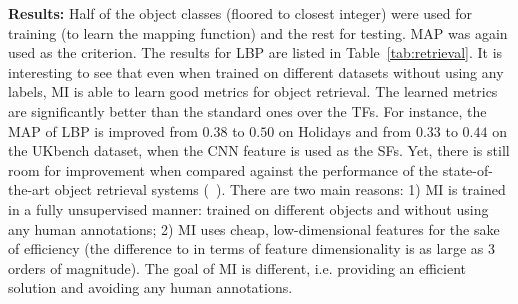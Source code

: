 \textbf{Results:} Half of the object classes (floored to closest integer) were used for training 
(to learn the mapping function) and the rest for testing. 
MAP was again used as the criterion.  The results for
LBP are listed in Table~\ref{tab:retrieval}.  %
It is interesting to see that even when trained on different datasets
without using any labels, MI is able to learn good metrics for object
retrieval. The learned metrics are significantly better than the
standard ones over the TFs. For instance, the MAP of LBP 
is improved from $0.38$ to $0.50$ on Holidays and from $0.33$ to
$0.44$ on the UKbench dataset, when the CNN feature is used as the SFs. Yet, there is still room for
improvement when compared against the performance of the
state-of-the-art object retrieval systems
(\eg~\citep{qin:bmvc14}). There are two main reasons: 1) MI is trained in a fully unsupervised manner:
trained on different objects and without using any human annotations; 2) MI uses cheap, low-dimensional features for
the sake of efficiency (the difference to \citep{qin:bmvc14} in terms
of feature dimensionality is as large as 3 orders of magnitude). The
goal of MI is different, i.e. providing an efficient solution and avoiding
any human annotations.

